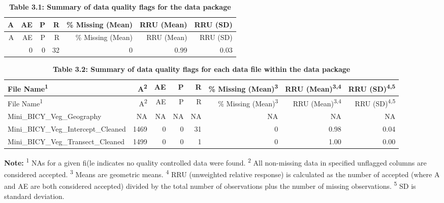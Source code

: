 \documentclass[
]{article}
\begin{document}
\begin{longtable}[]{@{}rrrrrrr@{}}
\caption{\textbf{Table 3.1: Summary of data quality flags for the data
package}}\tabularnewline
\toprule\noalign{}
A & AE & P & R & \% Missing (Mean) & RRU (Mean) & RRU (SD) \\
\midrule\noalign{}
\endfirsthead
\toprule\noalign{}
A & AE & P & R & \% Missing (Mean) & RRU (Mean) & RRU (SD) \\
\midrule\noalign{}
\endhead
\bottomrule\noalign{}
\endlastfoot
2968 & 0 & 0 & 32 & 0 & 0.99 & 0.03 \\
\end{longtable}

\begin{longtable}[]{@{}lrrrrrrr@{}}
\caption{\textbf{Table 3.2: Summary of data quality flags for each data
file within the data package}}\tabularnewline
\toprule\noalign{}
File Name\textsuperscript{1} & A\textsuperscript{2} & AE & P & R & \%
Missing (Mean)\textsuperscript{3} & RRU (Mean)\textsuperscript{3,4} &
RRU (SD)\textsuperscript{4,5} \\
\midrule\noalign{}
\endfirsthead
\toprule\noalign{}
File Name\textsuperscript{1} & A\textsuperscript{2} & AE & P & R & \%
Missing (Mean)\textsuperscript{3} & RRU (Mean)\textsuperscript{3,4} &
RRU (SD)\textsuperscript{4,5} \\
\midrule\noalign{}
\endhead
\bottomrule\noalign{}
\endlastfoot
Mini\_BICY\_Veg\_Geography & NA & NA & NA & NA & NA & NA & NA \\
Mini\_BICY\_Veg\_Intercept\_Cleaned & 1469 & 0 & 0 & 31 & 0 & 0.98 &
0.04 \\
Mini\_BICY\_Veg\_Transect\_Cleaned & 1499 & 0 & 0 & 1 & 0 & 1.00 &
0.00 \\
\end{longtable}

\textbf{Note:} \textsuperscript{1} NAs for a given fi(le indicates no
quality controlled data were found. \textsuperscript{2} All non-missing
data in specified unflagged columns are considered accepted.
\textsuperscript{3} Means are geometric means. \textsuperscript{4} RRU
(unweighted relative response) is calculated as the number of accepted
(where A and AE are both considered accepted) divided by the total
number of observations plus the number of missing observations.
\textsuperscript{5} SD is standard deviation.
\end{document}
